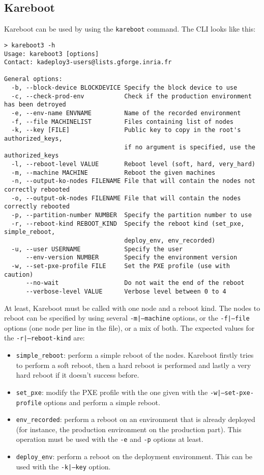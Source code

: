 \documentclass[a4wide,10pt,oneside]{book}
\begin{document}
\subsection{Kareboot}
Kareboot can be used by using the \texttt{kareboot} command. The CLI looks like this:
\begin{small}
\begin{verbatim}
> kareboot3 -h
Usage: kareboot3 [options]
Contact: kadeploy3-users@lists.gforge.inria.fr

General options:
  -b, --block-device BLOCKDEVICE Specify the block device to use
  -c, --check-prod-env           Check if the production environment has been detroyed
  -e, --env-name ENVNAME         Name of the recorded environment
  -f, --file MACHINELIST         Files containing list of nodes
  -k, --key [FILE]               Public key to copy in the root's authorized_keys, 
                                 if no argument is specified, use the authorized_keys
  -l, --reboot-level VALUE       Reboot level (soft, hard, very_hard)
  -m, --machine MACHINE          Reboot the given machines
  -n, --output-ko-nodes FILENAME File that will contain the nodes not correctly rebooted
  -o, --output-ok-nodes FILENAME File that will contain the nodes correctly rebooted
  -p, --partition-number NUMBER  Specify the partition number to use
  -r, --reboot-kind REBOOT_KIND  Specify the reboot kind (set_pxe, simple_reboot, 
                                 deploy_env, env_recorded)
  -u, --user USERNAME            Specify the user
      --env-version NUMBER       Specify the environment version
  -w, --set-pxe-profile FILE     Set the PXE profile (use with caution)
      --no-wait                  Do not wait the end of the reboot
      --verbose-level VALUE      Verbose level between 0 to 4
\end{verbatim}
\end{small}

At least, Kareboot must be called with one node and a reboot kind. The nodes to reboot can be specified by using several \texttt{-m|--machine} options, or the \texttt{-f|--file} options (one node per line in the file), or a mix of both. The expected values for the \texttt{-r|--reboot-kind} are:
\begin{itemize}
\item \texttt{simple\_reboot}: perform a simple reboot of the nodes. Kareboot firstly tries to perform a soft reboot, then a hard reboot is performed and lastly a very hard reboot if it doesn't success before.
\item \texttt{set\_pxe}: modify the PXE profile with the one given with the \texttt{-w|--set-pxe-profile} options and perform a simple reboot.
\item \texttt{env\_recorded}: perform a reboot on an environment that is already deployed (for instance, the production environment on the production part). This operation must be used with the \texttt{-e} and \texttt{-p} options at least.
\item \texttt{deploy\_env}: perform a reboot on the deployment environment. This can be used with the \texttt{-k|--key} option.
\end{itemize}
\end{document}
